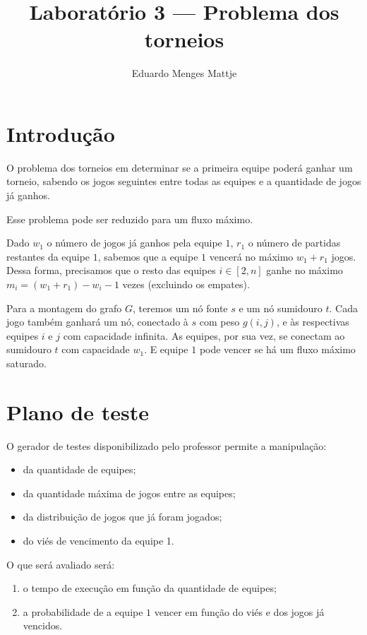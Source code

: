 \documentclass[11pt]{article}
\title{Laboratório 3 — Problema dos torneios}
\author{Eduardo Menges Mattje}
\begin{document}
\maketitle

\section{Introdução}

O problema dos torneios em determinar se a primeira equipe poderá ganhar um torneio, sabendo os jogos seguintes entre todas as equipes e a quantidade de jogos já ganhos.

Esse problema pode ser reduzido para um fluxo máximo.

Dado $w_1$ o número de jogos já ganhos pela equipe $1$, $r_1$ o número de partidas restantes da equipe $1$, sabemos que a equipe $1$ vencerá no máximo $w_1 + r_1$ jogos.
Dessa forma, precisamos que o resto das equipes $i \in [2, n]$ ganhe no máximo $m_i = (w_1 + r_1) - w_i - 1$ vezes (excluindo os empates).

Para a montagem do grafo $G$, teremos um nó fonte $s$ e um nó sumidouro $t$.
Cada jogo também ganhará um nó, conectado à $s$ com peso $g(i,j)$, e às respectivas equipes $i$ e $j$ com capacidade infinita.
As equipes, por sua vez, se conectam ao sumidouro $t$ com capacidade $w_1$.
E equipe $1$ pode vencer se há um fluxo máximo saturado.

\section{Plano de teste}

O gerador de testes disponibilizado pelo professor permite a manipulação:

\begin{itemize}
	\item da quantidade de equipes;
    \item da quantidade máxima de jogos entre as equipes;
    \item da distribuição de jogos que já foram jogados;
    \item do viés de vencimento da equipe 1.
\end{itemize}

O que será avaliado será:

\begin{enumerate}
	\item o tempo de execução em função da quantidade de equipes;
	\item a probabilidade de a equipe $1$ vencer em função do viés e dos jogos já vencidos.
\end{enumerate}
\end{document}
